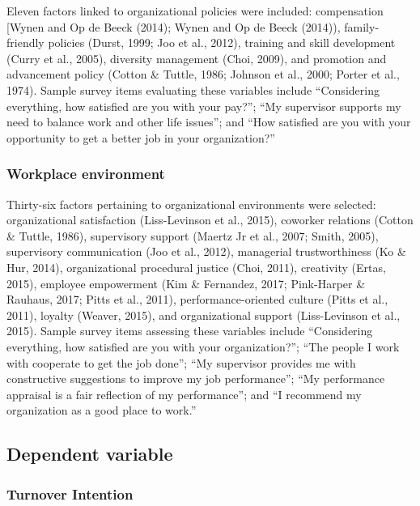 \documentclass[
  man]{apa7}
\begin{document}
Eleven factors linked to organizational policies were included: compensation {[}Wynen and Op de Beeck (2014); Wynen and Op de Beeck (2014)), family-friendly policies (Durst, 1999; Joo et al., 2012), training and skill development (Curry et al., 2005), diversity management (Choi, 2009), and promotion and advancement policy (Cotton \& Tuttle, 1986; Johnson et al., 2000; Porter et al., 1974).
Sample survey items evaluating these variables include ``Considering everything, how satisfied are you with your pay?''; ``My supervisor supports my need to balance work and other life issues''; and ``How satisfied are you with your opportunity to get a better job in your organization?''

\hypertarget{workplace-environment}{%
\subsubsection{Workplace environment}\label{workplace-environment}}

Thirty-six factors pertaining to organizational environments were selected: organizational satisfaction (Liss-Levinson et al., 2015), coworker relations (Cotton \& Tuttle, 1986), supervisory support (Maertz Jr et al., 2007; Smith, 2005), supervisory communication (Joo et al., 2012), managerial trustworthiness (Ko \& Hur, 2014), organizational procedural justice (Choi, 2011), creativity (Ertas, 2015), employee empowerment (Kim \& Fernandez, 2017; Pink-Harper \& Rauhaus, 2017; Pitts et al., 2011), performance-oriented culture (Pitts et al., 2011), loyalty (Weaver, 2015), and organizational support (Liss-Levinson et al., 2015).
Sample survey items assessing these variables include ``Considering everything, how satisfied are you with your organization?''; ``The people I work with cooperate to get the job done''; ``My supervisor provides me with constructive suggestions to improve my job performance''; ``My performance appraisal is a fair reflection of my performance''; and ``I recommend my organization as a good place to work.''

\hypertarget{dependent-variable}{%
\subsection{Dependent variable}\label{dependent-variable}}

\hypertarget{turnover-intention}{%
\subsubsection{Turnover Intention}\label{turnover-intention}}
\end{document}
